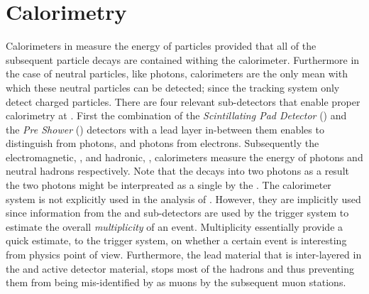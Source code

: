 

\section{Calorimetry}
\label{det_calo}
Calorimeters in \lhcb measure the energy of particles provided that all of the subsequent particle decays are
contained withing the calorimeter. Furthermore in the case of neutral particles, like photons,
calorimeters are the only mean with which these neutral particles can be detected; since the tracking system
only detect charged particles. There are four relevant sub-detectors
that enable proper calorimetry at \lhcb. First the combination of the {\it Scintillating Pad Detector} (\spd)
and the {\it Pre Shower} (\presh) detectors with a lead layer in-between them enables to distinguish \piz from
photons, and photons from electrons. Subsequently the electromagnetic, \ecal, and hadronic,
\hcal, calorimeters measure the energy of photons and neutral hadrons respectively.
Note that the \piz decays into two photons as a result the two photons might be interpreated as a single by the \ecal.
The calorimeter system is not explicitly used in the analysis of .
However, they are implicitly used since information from the \spd and \presh sub-detectors are used
by the \lzero trigger system to estimate the overall {\it multiplicity} of an event. Multiplicity essentially
provide a quick estimate, to the \lzero trigger system, on whether a certain event is interesting from physics
point of view. Furthermore, the lead material that is inter-layered in the \ecal and \hcal active detector material,
stops most of the hadrons and thus preventing them from being mis-identified by as muons by the subsequent muon stations.

